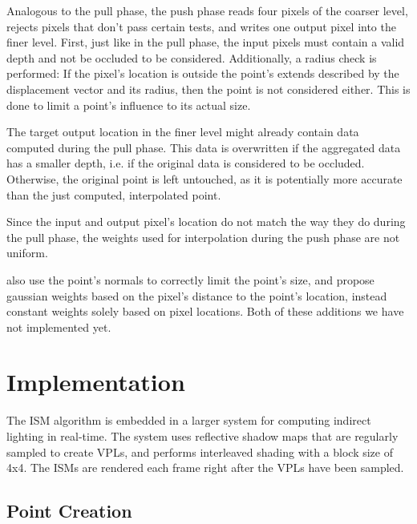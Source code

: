 Analogous to the pull phase, the push phase reads four pixels of the coarser level, rejects pixels that don't pass certain tests, and writes one output pixel into the finer level. First, just like in the pull phase, the input pixels must contain a valid depth and not be occluded to be considered. Additionally, a radius check is performed: If the pixel's location is outside the point's extends described by the displacement vector and its radius, then the point is not considered either. This is done to limit a point's influence to its actual size.

The target output location in the finer level might already contain data computed during the pull phase. This data is overwritten if the aggregated data has a smaller depth, i.e. if the original data is considered to be occluded. Otherwise, the original point is left untouched, as it is potentially more accurate than the just computed, interpolated point.

Since the input and output pixel's location do not match the way they do during the pull phase, the weights used for interpolation during the push phase are not uniform.

 \cite{Marroquim:2007:reconstruction} also use the point's normals to correctly limit the point's size, and \cite{Marroquim:2008:reconstruction2} propose gaussian weights based on the pixel's distance to the point's location, instead constant weights solely based on pixel locations. Both of these additions we have not implemented yet.







 \section{Implementation}

The ISM algorithm is embedded in a larger system for computing indirect lighting in real-time. The system uses reflective shadow maps \cite{Dachsbacher:2005:RSM} that are regularly sampled to create VPLs, and performs interleaved shading \cite{Keller:2001:InterleavedSampling} with a block size of 4x4. The ISMs are rendered each frame right after the VPLs have been sampled.

 \subsection{Point Creation}
 \label{sec:impl:ismRendering}

